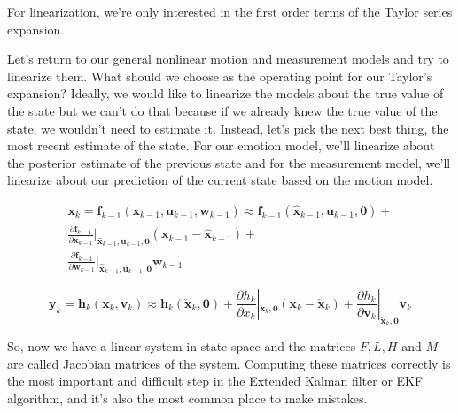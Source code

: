 For linearization, we're only interested in the first order terms of the Taylor
series expansion. 

Let's return to our general nonlinear motion and measurement models and
try to linearize them. What should we choose as the operating
point for our Taylor's expansion? Ideally, we would like to linearize
the models about the true value of the state but we can't do that because if we already knew
the true value of the state, we wouldn't need to estimate it. Instead, let's pick
the next best thing, the most recent estimate of the state. For our emotion model, we'll linearize about
the posterior estimate of the previous state and
for the measurement model, we'll linearize about our prediction of the current state based
on the motion model.



\begin{eqnarray}
\mathbf{x}_k = \mathbf{f}_{k-1}(\mathbf{x}_{k-1}, \mathbf{u}_{k-1}, \mathbf{w}_{k-1}) \approx \mathbf{f}_{k-1}(\hat{\mathbf{x}}_{k-1}, \mathbf{u}_{k-1}, \mathbf{0}) +  \nonumber \\
\frac{\partial \mathbf{f}_{k-1}}{\partial \mathbf{x}_{k-1}} |_{\hat{\mathbf{x}}_{k-1}, \mathbf{u}_{k-1}, \mathbf{0} } (\mathbf{x}_{k-1}-\hat{\mathbf{x}}_{k-1}) + \nonumber \\
\frac{\partial \mathbf{f}_{k-1}}{\partial \mathbf{w}_{k-1}}|_{\hat{\mathbf{x}}_{k-1}, \mathbf{u}_{k-1}, \mathbf{0} } \mathbf{w}_{k-1}
\end{eqnarray}


\begin{equation}
\mathbf{y}_k = \mathbf{h}_k(\mathbf{x}_k, \mathbf{v}_k) \approx \mathbf{h}_k(\check{\mathbf{x}}_k, \mathbf{0}) + \frac{\partial h_k}{\partial x_k} |_{\check{\mathbf{x}}_{k}, \mathbf{0}} (\mathbf{x}_k-\check{\mathbf{x}}_k) + \frac{\partial h_k}{\partial \mathbf{v}_k} |_{\check{\mathbf{x}}_k, \mathbf{0}} \mathbf{v}_k
\end{equation}

 So, now we have a linear system in
state space and the matrices $F, L, H$ and $M$ are called Jacobian
matrices of the system. Computing these matrices correctly is the most important and difficult step in the Extended Kalman filter or EKF algorithm, and it's also the most common
place to make mistakes. 

